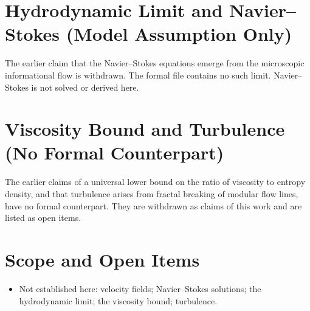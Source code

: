 \documentclass[11pt, a4paper]{article}
\begin{document}
\section{Hydrodynamic Limit and Navier--Stokes (Model Assumption Only)}
The earlier claim that the Navier--Stokes equations emerge from the microscopic informational flow is withdrawn. The formal file contains no such limit. Navier--Stokes is not solved or derived here.

\section{Viscosity Bound and Turbulence (No Formal Counterpart)}
The earlier claims of a universal lower bound on the ratio of viscosity to entropy density, and that turbulence arises from fractal breaking of modular flow lines, have no formal counterpart. They are withdrawn as claims of this work and are listed as open items.

\section{Scope and Open Items}
\begin{itemize}
  \item Not established here: velocity fields; Navier--Stokes solutions; the hydrodynamic limit; the viscosity bound; turbulence.
\end{itemize}
\end{document}
